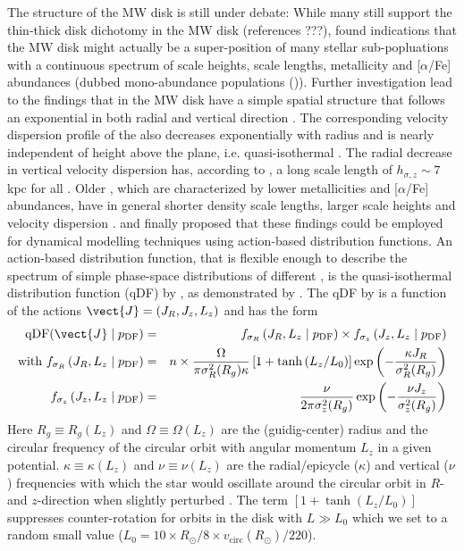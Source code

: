 The structure of the MW disk is still under debate: While many still support the thin-thick disk dichotomy in the MW disk (references ???), \citet{bov12b} found indications that the MW disk might actually be a super-position of many stellar sub-popluations with a continuous spectrum of scale heights, scale lengths, metallicity and [$\alpha$/Fe] abundances (dubbed mono-abundance populations (\MAPs)). Further investigation lead to the findings that \MAPs in the MW disk have a simple spatial structure that follows an exponential in both radial and vertical direction \citep{bov12d}. The corresponding velocity dispersion profile of the \MAPs also decreases exponentially with radius and is nearly independent of height above the plane, i.e. quasi-isothermal \citep{bov12c}. The radial decrease in vertical velocity dispersion has, according to \citet{bov12c}, a long scale length of $h_{\sigma,z} \sim 7$ kpc for all \MAPs. Older \MAPs, which are characterized by lower metallicities and [$\alpha$/Fe] abundances, have in general shorter density scale lengths, larger scale heights and velocity dispersion \citep{bov12d}. \citet{tin13} and \citet{bov13} finally proposed that these findings could be employed for dynamical modelling techniques using action-based distribution functions. An action-based distribution function, that is flexible enough to describe the spectrum of simple phase-space distributions of different \MAPs, is the quasi-isothermal distribution function (qDF) by \citet{bin11}, as demonstrated by \citet{tin13}.  The qDF by \citet{bin11} is a function of the actions $\vect{J}=(J_R,J_z,L_z)$ and has the form
\begin{eqnarray}
\text{qDF}(\vect{J} \mid p_\text{DF}) &=& f_{\sigma_R}\left(J_R,L_z \mid p_\text{DF}\right) \times f_{\sigma_z}\left(J_z,L_z \mid p_\text{DF}\right)\label{eq:df_general}\\
\text{with } f_{\sigma_R}\left(J_R,L_z \mid p_\text{DF}\right) &=& n \times \frac{\Omega}{\pi\sigma_R^2(R_g) \kappa}\left[1+\tanh\left(L_z/L_0\right) \right]\exp\left(-\frac{\kappa J_R}{\sigma_R^2(R_g)} \right) \\
f_{\sigma_z}\left(J_z,L_z \mid p_\text{DF} \right) &=& \frac{\nu}{2 \pi \sigma_z^2(R_g)} \exp\left( -\frac{\nu J_z}{\sigma_z^2(R_g)} \right) \\
\end{eqnarray}
Here $R_g \equiv R_g(L_z)$ and $\Omega\equiv \Omega(L_z)$ are the (guidig-center) radius and the circular frequency of the circular orbit with angular momentum $L_z$ in a given potential. $\kappa\equiv \kappa(L_z)$ and $\nu\equiv \nu(L_z)$ are the radial/epicycle ($\kappa$) and vertical ($\nu$) frequencies with which the star would oscillate around the circular orbit in $R$- and $z$-direction when slightly perturbed \citep{bin08}. The term $\left[1+\tanh\left(L_z/L_0\right) \right]$ suppresses counter-rotation for orbits in the disk with $L \gg L_0$ which we set to a random small value ($L_0 = 10 \times R_\odot/8 \times v_\text{circ}(R_\odot)/220$).
